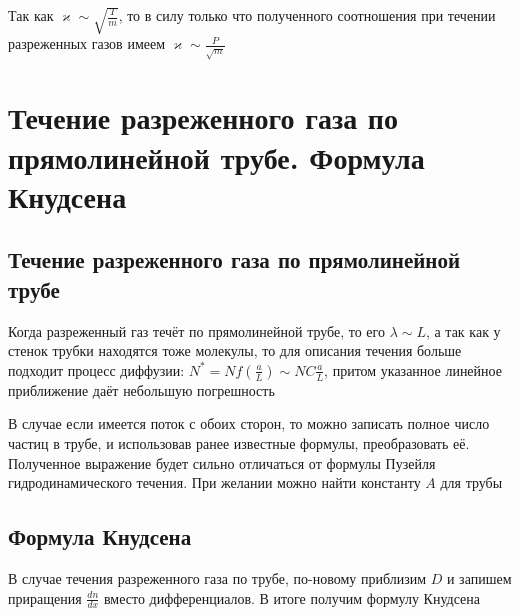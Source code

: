 \documentclass[a4paper, 14pt]{article}
\begin{document}
    Так как $\varkappa \sim \sqrt{\frac{T}{m}}$, то в силу только что полученного соотношения при течении
    разреженных газов имеем $\varkappa \sim \frac{P}{\sqrt{m}}$

    \section{Течение разреженного газа по прямолинейной трубе.
    Формула Кнудсена}

    \subsection{Течение разреженного газа по прямолинейной трубе}

    Когда разреженный газ течёт по прямолинейной трубе, то его $\lambda \sim L$, а так как у стенок трубки находятся
    тоже молекулы, то для описания течения больше подходит процесс диффузии: $N^* = N f\left(\frac{a}{L}\right) \sim
    NC\frac{a}{L}$, притом указанное линейное приближение даёт небольшую погрешность

    В случае если имеется поток с обоих сторон, то можно записать полное число частиц в трубе, и использовав ранее
    известные формулы, преобразовать её.
    Полученное выражение будет сильно отличаться от формулы Пузейля гидродинамического течения.
    При желании можно найти константу $A$ для трубы

    \subsection{Формула Кнудсена}

    В случае течения разреженного газа по трубе, по-новому приблизим $D$ и запишем приращения $\frac{dn}{dx}$ вместо
    дифференциалов.
    В итоге получим формулу Кнудсена
\end{document}
